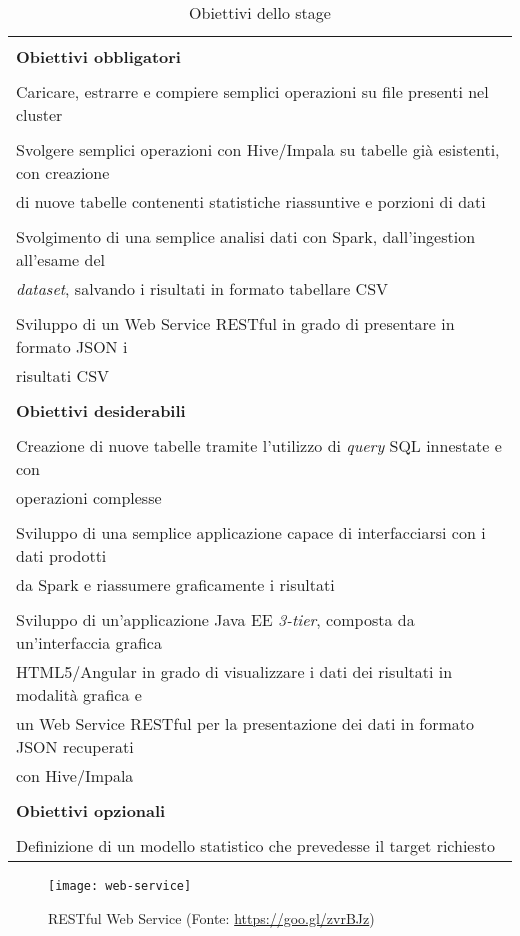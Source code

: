 \begin{table}[!h] %
	\caption{Obiettivi dello stage}
	\label{tab:obiettivi-stage}
	\begin{tabular}{|l|}
		\hline
		\\[-2mm]
		\textbf{Obiettivi obbligatori}\\
		\hline
		\\[-2mm]
		Caricare, estrarre e compiere semplici operazioni su file presenti nel \gls{cluster}	\\
		\hline
		\\[-2mm]
		Svolgere semplici operazioni con Hive/Impala su tabelle già esistenti, con creazione \\ di nuove tabelle contenenti statistiche riassuntive e porzioni di dati	\\
		\hline
		\\[-2mm]
		Svolgimento di una semplice analisi dati con Spark, dall'ingestion all'esame del \\ \textit{dataset}, salvando i risultati in formato tabellare CSV	\\
		\hline
		\\[-2mm]
		Sviluppo di un \gls{Web Service} RESTful in grado di presentare in formato JSON i \\ risultati CSV \\
		\hline
		\hline
		\\[-2mm]
		\textbf{Obiettivi desiderabili}\\
		\hline
		\\[-2mm]
		Creazione di nuove tabelle tramite l'utilizzo di \textit{query} SQL innestate e con \\ operazioni complesse \\
		\hline
		\\[-2mm]
		Sviluppo di una semplice applicazione capace di interfacciarsi con i dati prodotti \\ da Spark e riassumere graficamente i risultati \\
		\hline
		\\[-2mm]
		Sviluppo di un'applicazione Java EE \textit{3-tier}, composta da un'interfaccia grafica \\ HTML5/Angular in grado di visualizzare i dati dei risultati in modalità grafica e \\ un Web Service RESTful per la presentazione dei dati in formato JSON recuperati \\ con Hive/Impala \\
		\hline
		\hline
		\\[-2mm]
		\textbf{Obiettivi opzionali}\\
		\hline
		\\[-2mm]
		Definizione di un modello statistico che prevedesse il target richiesto \\
		\hline
	\end{tabular}
\end{table}%
\clearpage
\begin{figure}[!h] 
	\centering 
	\texttt{[image: web-service]}
	\caption{RESTful Web Service (Fonte: \href{https://goo.gl/zvrBJz}{https://goo.gl/zvrBJz})}
\end{figure}

